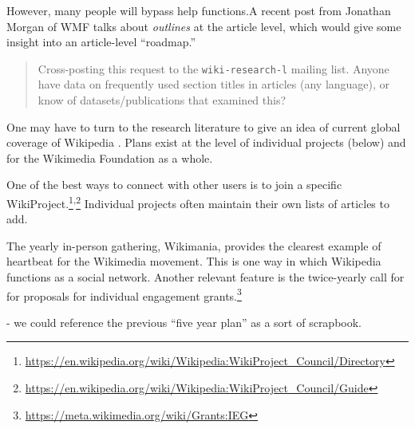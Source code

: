 However, many people will bypass help functions.A recent post from
Jonathan Morgan of WMF talks about \emph{outlines} at the article
level, which would give some insight into an article-level
``roadmap.''

\begin{quotation}
\noindent Cross-posting this request to the {\tt wiki-research-l} mailing
list. Anyone have data on frequently used section titles in articles
(any language), or know of datasets/publications that examined this?
\end{quotation}

One may have to turn to the research literature to give an idea of
current global coverage of Wikipedia \cite{holloway2007analyzing}.
Plans exist at the level of individual projects (below) and for the
Wikimedia Foundation as a whole.

 One of the best ways to connect with
other users is to join a specific
WikiProject.\footnote{\url{https://en.wikipedia.org/wiki/Wikipedia:WikiProject_Council/Directory}}\textsuperscript{,}\footnote{\url{https://en.wikipedia.org/wiki/Wikipedia:WikiProject_Council/Guide}}
Individual projects often maintain their own lists of articles to add.
 
 The yearly in-person gathering, Wikimania,
provides the clearest example of heartbeat for the Wikimedia movement.
This is one way in which Wikipedia functions as a social network. 
Another relevant feature is the twice-yearly call for for proposals for
individual engagement grants.\footnote{\url{https://meta.wikimedia.org/wiki/Grants:IEG}}

 - we could reference the previous ``five year
plan'' as a sort of scrapbook.

